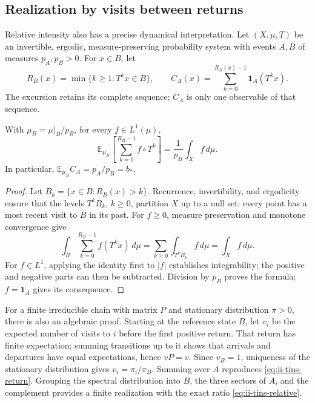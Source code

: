 \subsection{Realization by visits between returns}
\label{subsec:ii-tins-retornos}

Relative intensity also has a precise dynamical interpretation. Let
$(X,\mu,T)$ be an invertible, ergodic, measure-preserving probability
system with events $A,B$ of measures $p_A,p_B>0$. For $x\in B$, let
\[
 R_B(x)=\min\{k\ge1:T^kx\in B\},\qquad
 C_A(x)=\sum_{k=0}^{R_B(x)-1}\mathbf1_A(T^kx).
\]
The excursion retains its complete sequence; $C_A$ is only one observable
of that sequence.

\begin{theorem}
\label{thm:ii-tins-return}
With $\mu_B=\mu|_B/p_B$, for every $f\in L^1(\mu)$,
\begin{equation}
 \mathbb E_{\mu_B}\!\left[\sum_{k=0}^{R_B-1}f\circ T^k\right]
 =\frac1{p_B}\int_Xf\,d\mu.
 \label{eq:ii-tins-return}
\end{equation}
In particular, $\mathbb E_{\mu_B}C_A=p_A/p_B=b_*$.
\end{theorem}
\begin{proof}
Let $B_k=\{x\in B:R_B(x)>k\}$. Recurrence, invertibility, and
ergodicity ensure that the levels $T^kB_k$, $k\ge0$, partition $X$
up to a null set: every point has a most recent visit to $B$ in its past.
For $f\ge0$, measure preservation and monotone convergence give
\[
 \int_B\sum_{k=0}^{R_B-1}f(T^kx)\,d\mu
 =\sum_{k\ge0}\int_{T^kB_k}f\,d\mu=\int_Xf\,d\mu.
\]
For $f\in L^1$, applying the identity first to $|f|$ establishes
integrability; the positive and negative parts can then be subtracted.
Division by $p_B$ proves the formula; $f=\mathbf1_A$ gives its consequence.
\end{proof}

For a finite irreducible chain with matrix $P$ and stationary distribution
$\pi>0$, there is also an algebraic proof. Starting at the reference
state $B$, let $v_i$ be the expected number of visits to $i$ before the
first positive return. That return has finite expectation; summing
transitions up to it shows that arrivals and departures have equal
expectations, hence $vP=v$. Since $v_B=1$, uniqueness of the stationary
distribution gives $v_i=\pi_i/\pi_B$. Summing over $A$ reproduces
\eqref{eq:ii-tins-return}. Grouping the spectral distribution into $B$,
the three sectors of $A$, and the complement provides a finite realization
with the exact ratio \eqref{eq:ii-tins-relative}.

